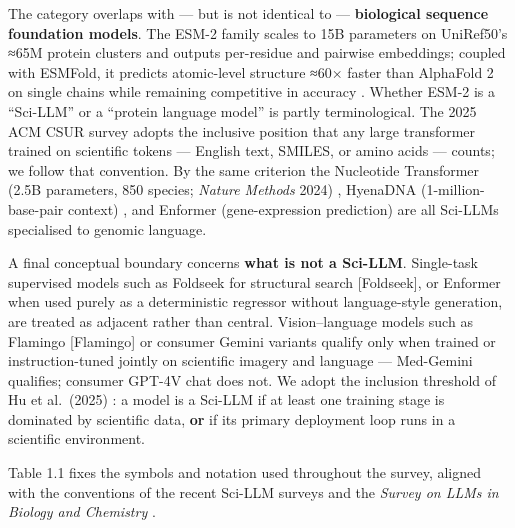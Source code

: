 \documentclass{article}
\begin{document}
The category overlaps with --- but is not identical to --- \textbf{biological sequence foundation models}. The ESM-2 family scales to 15B parameters on UniRef50's ≈65M protein clusters and outputs per-residue and pairwise embeddings; coupled with ESMFold, it predicts atomic-level structure ≈60× faster than AlphaFold 2 on single chains while remaining competitive in accuracy \cite{lin2022evolutionaryscalep}. Whether ESM-2 is a ``Sci-LLM'' or a ``protein language model'' is partly terminological. The 2025 ACM CSUR survey \cite{zhang2025scientificlargelan} adopts the inclusive position that any large transformer trained on scientific tokens --- English text, SMILES, or amino acids --- counts; we follow that convention. By the same criterion the Nucleotide Transformer (2.5B parameters, 850 species; \emph{Nature Methods} 2024) \cite{dallatorre2024nucleotidetransfor}, HyenaDNA (1-million-base-pair context) \cite{nguyen2023hyenadnalongrangeg}, and Enformer (gene-expression prediction) \cite{avsec2021effectivegeneexpre} are all Sci-LLMs specialised to genomic language.

A final conceptual boundary concerns \textbf{what is not a Sci-LLM}. Single-task supervised models such as Foldseek for structural search {[}Foldseek{]}, or Enformer when used purely as a deterministic regressor without language-style generation, are treated as adjacent rather than central. Vision--language models such as Flamingo {[}Flamingo{]} or consumer Gemini variants qualify only when trained or instruction-tuned jointly on scientific imagery and language --- Med-Gemini \cite{yang2024advancingmultimoda} qualifies; consumer GPT-4V chat does not. We adopt the inclusion threshold of Hu et al.~(2025) \cite{hu2025asurveyofscientifi}: a model is a Sci-LLM if at least one training stage is dominated by scientific data, \textbf{or} if its primary deployment loop runs in a scientific environment.

Table 1.1 fixes the symbols and notation used throughout the survey, aligned with the conventions of the recent Sci-LLM surveys \cite{zhang2025scientificlargelan,zhang2024acomprehensivesurv,luo2025llm4srasurveyonlar,wei2025fromaiforscienceto,zheng2025fromautomationtoau,hu2025asurveyofscientifi} and the \emph{Survey on LLMs in Biology and Chemistry} \cite{ashyrmamatov2026asurveyonlargelang}.
\end{document}
